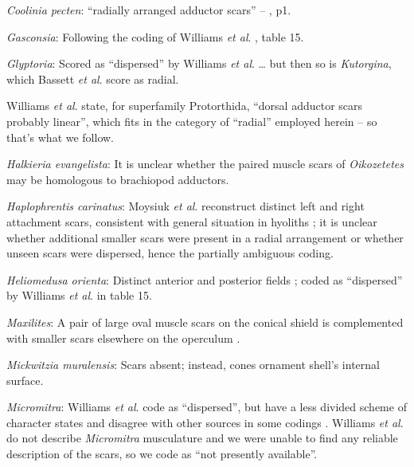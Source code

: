 \documentclass[openany]{book}
\begin{document}
\hypertarget{Coolinia_pecten-coding-85}{}
\emph{Coolinia pecten}: ``radially arranged adductor scars'' --
\citet{Bassett2017Earliestontogeny}, p1.

\hypertarget{Gasconsia-coding-85}{}
\emph{Gasconsia}: Following the coding of Williams \emph{et al}.
\citeyearpar{Williams2000LinguliformeaCraniiformea}, table 15.

\hypertarget{Glyptoria-coding-85}{}
\emph{Glyptoria}: Scored as ``dispersed'' by Williams \emph{et al}.
\citeyearpar{Williams1998Thediversity} \ldots{} but then so is
\emph{Kutorgina}, which Bassett \emph{et al}.
\citeyearpar{Bassett2001Functionalmorphology} score as radial.

Williams \emph{et al}.
\citeyearpar{Williams2000LinguliformeaCraniiformea} state, for
superfamily Protorthida, ``dorsal adductor scars probably linear'',
which fits in the category of ``radial'' employed herein -- so that's
what we follow.

\hypertarget{Halkieria_evangelista-coding-85}{}
\emph{Halkieria evangelista}: It is unclear whether the paired muscle
scars of \emph{Oikozetetes} may be homologous to brachiopod adductors.

\hypertarget{Haplophrentis_carinatus-coding-85}{}
\emph{Haplophrentis carinatus}: Moysiuk \emph{et al}.
\citeyearpar{Moysiuk2017Hyolithsare} reconstruct distinct left and right
attachment scars, consistent with general situation in hyoliths
\citep[see][]{Dzik1980Ontogenyof}; it is unclear whether additional
smaller scars were present in a radial arrangement \citep[as in e.g.
\emph{Gompholites},][]{Marek1967} or whether unseen scars were
dispersed, hence the partially ambiguous coding.

\hypertarget{Heliomedusa_orienta-coding-85}{}
\emph{Heliomedusa orienta}: Distinct anterior and posterior fields
\citep{Chen2007Reinterpretationof}; coded as ``dispersed'' by Williams
\emph{et al}. \citeyearpar{Williams2000LinguliformeaCraniiformea} in
table 15.

\hypertarget{Maxilites-coding-85}{}
\emph{Maxilites}: A pair of large oval muscle scars on the conical
shield is complemented with smaller scars elsewhere on the operculum
\citep{Marek1972, MartiMus2005}.

\hypertarget{Mickwitzia_muralensis-coding-85}{}
\emph{Mickwitzia muralensis}: Scars absent; instead, cones ornament
shell's internal surface.

\hypertarget{Micromitra-coding-85}{}
\emph{Micromitra}: Williams \emph{et al}.
\citeyearpar{Williams1998Thediversity} code as ``dispersed'', but have a
less divided scheme of character states and disagree with other sources
in some codings \citep[e.g.][in
Kutorginates]{Bassett2001Functionalmorphology}. Williams \emph{et al}.
\citeyearpar{Williams2000LinguliformeaCraniiformea} do not describe
\emph{Micromitra} musculature and we were unable to find any reliable
description of the scars, so we code as ``not presently available''.
\end{document}

